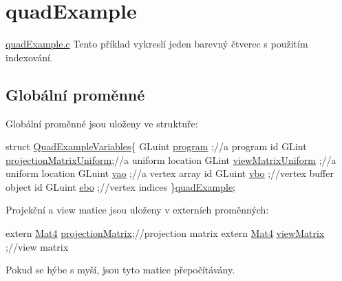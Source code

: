 \hypertarget{quadExample-example}{\section{quad\-Example}
}
\hyperlink{quadExample_8c}{quad\-Example.\-c}  Tento příklad vykreslí jeden barevný čtverec s použitím indexování. \hypertarget{quadExample.c_Globals}{}\subsection{Globální proměnné}\label{quadExample.c_Globals}
Globální proměnné jsou uloženy ve struktuře\-: 
\begin{DoxyCodeInclude}

\textcolor{keyword}{struct }\hyperlink{structQuadExampleVariables}{QuadExampleVariables}\{
  GLuint \hyperlink{structQuadExampleVariables_a63971781ff860bd201886926f943ba78}{program}                ;\textcolor{comment}{//a program id}
\textcolor{comment}{}  GLint  \hyperlink{structQuadExampleVariables_a38a1023cb8ee3692e195ea574e43c51a}{projectionMatrixUniform};\textcolor{comment}{//a uniform location}
\textcolor{comment}{}  GLint  \hyperlink{structQuadExampleVariables_a9c505e0a089ecd495b18550309ebab77}{viewMatrixUniform}      ;\textcolor{comment}{//a uniform location}
\textcolor{comment}{}  GLuint \hyperlink{structQuadExampleVariables_a294c388653d62435d7eeb7994f45c4fc}{vao}                    ;\textcolor{comment}{//a vertex array id}
\textcolor{comment}{}  GLuint \hyperlink{structQuadExampleVariables_a69515fd546272c117e14f784221f6412}{vbo}                    ;\textcolor{comment}{//vertex buffer object id}
\textcolor{comment}{}  GLuint \hyperlink{structQuadExampleVariables_a3b1abdb0f18593a0ebec8dd9a222164b}{ebo}                    ;\textcolor{comment}{//vertex indices}
\}\hyperlink{quadExample_8c_ad961415145a9c30bd9846d4a278cc63a}{quadExample};
\end{DoxyCodeInclude}
Projekční a view matice jsou uloženy v externích proměnných\-: 
\begin{DoxyCodeInclude}
\textcolor{keyword}{extern} \hyperlink{structMat4}{Mat4} \hyperlink{mouseCamera_8c_a1f344d924f733a22d7659db612a0efe8}{projectionMatrix};\textcolor{comment}{//projection matrix}
\textcolor{comment}{}\textcolor{keyword}{extern} \hyperlink{structMat4}{Mat4} \hyperlink{mouseCamera_8c_ae64ebe4c77936fc93d161b97bd8e96df}{viewMatrix}      ;\textcolor{comment}{//view matrix}
\end{DoxyCodeInclude}
Pokud se hýbe s myší, jsou tyto matice přepočítávány.\par
